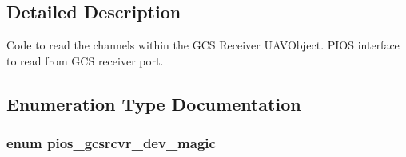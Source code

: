\subsection{Detailed Description}
Code to read the channels within the G\-C\-S Receiver U\-A\-V\-Object. P\-I\-O\-S interface to read from G\-C\-S receiver port.

\subsection{Enumeration Type Documentation}
\hypertarget{group___p_i_o_s___g_c_s_r_c_v_r_ga88de96a8f2cf14a06395b79f0996c923}{
\subsubsection[{pios\-\_\-gcsrcvr\-\_\-dev\-\_\-magic}]{\setlength{\rightskip}{0pt plus 5cm}enum {\bf pios\-\_\-gcsrcvr\-\_\-dev\-\_\-magic}}}\label{group___p_i_o_s___g_c_s_r_c_v_r_ga88de96a8f2cf14a06395b79f0996c923}
